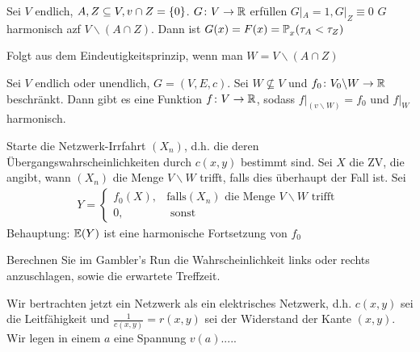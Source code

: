 \begin{korollar}
	Sei $V$ endlich, $A,Z \subseteq V, v \cap Z = \{0\}$. $G \colon V \to \mathbb{R}$ erfüllen $G|_A = 1, G|_Z \equiv 0$ $G$ harmonisch azf $V \backslash (A \cap Z)$. Dann ist $G(x) = F(x) = \prop{\tau_A < \tau_Z}[][x]$
\end{korollar}
\begin{beweis}
	Folgt aus dem Eindeutigkeitsprinzip, wenn man $W = V\backslash (A \cap Z)$
\end{beweis}

\begin{satz}[Existenzprinzip]
	Sei $V$ endlich oder unendlich, $G = (V,E,c)$. Sei $W \nsubseteq V$ und $f_0 \colon V_0 \backslash W \to \mathbb{R}$ beschränkt. Dann gibt es eine Funktion $f \colon V \to \mathbb{R}$, sodass $f|_(v \backslash W) = f_0$ und $f|_W$ harmonisch.
\end{satz}

\begin{beweis}
	Starte die Netzwerk-Irrfahrt $(X_n)$, d.h. die deren  Übergangswahrscheinlichkeiten durch $c(x,y)$ bestimmt sind. Sei $X$ die ZV, die angibt, wann $(X_n)$ die Menge $V \backslash W$ trifft, falls dies überhaupt der Fall ist. Sei
	\begin{gather}
		Y = 
		\begin{cases}
			f_0(X), & \text{falls} (X_n) \text{ die Menge } V \backslash W \text{ trifft } \\
			0, & \text{ sonst}
		\end{cases}
	\end{gather}
	Behauptung: $\EW{Y}$ ist eine harmonische Fortsetzung von $f_0$
\end{beweis}
\begin{uebung}
	Berechnen Sie im Gambler's Run die Wahrscheinlichkeit links oder rechts anzuschlagen, sowie die erwartete Treffzeit.
\end{uebung}
Wir bertrachten jetzt ein Netzwerk als ein elektrisches Netzwerk, d.h. $c(x,y)$ sei die Leitfähigkeit und $\frac{1}{c(x,y)} = r(x,y)$ sei der Widerstand der Kante $(x,y)$. Wir legen in einem $a$ eine Spannung $v(a)$.....




\newpage



